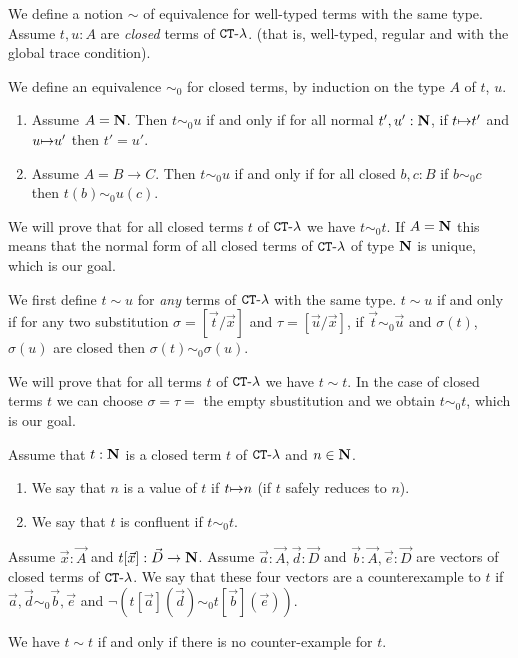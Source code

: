 \documentclass{article}
\begin{document}
We define a notion $\sim$ of equivalence for well-typed terms with the same type.
Assume $t, u : A$ are \emph{closed} terms of ${ {\tt CT} \mbox{-} \lambda}$.
 (that is, well-typed, regular and with the global trace condition). 

We define an equivalence $\sim_0$ for closed terms,
by induction on the type $A$ of $t$, $u$.

\begin{enumerate}
\item
Assume $A = {\bf N}$. Then $t \sim_0 u$ if and only if for all normal $t',u':{\bf N}$, if $t {\mapsto} t'$
and $u {\mapsto} u'$ then $t'=u'$.
\item
Assume $A = B \rightarrow C$. Then $t \sim_0 u$ if and only if for all closed $b,c:B$ if
$b \sim_0 c$ then $t(b) \sim_0 u(c)$.
\end{enumerate}

We will prove that for all closed terms $t$ of ${ {\tt CT} \mbox{-} \lambda}$ we have $t \sim_0 t$.
If $A={\bf N}$ this means that the normal form of all closed terms of ${ {\tt CT} \mbox{-} \lambda}$ of type ${\bf N}$ is unique,
which is our goal.

We first define $t \sim u$ for \emph{any} terms of ${ {\tt CT} \mbox{-} \lambda}$ with the same type.
 $t \sim u$ if and only if for any two substitution 
$\sigma = [\vec{t} / \vec{x}]$ and $\tau = [\vec{u} / \vec{x}]$,
if $\vec{t} \sim_0 \vec{u}$ and $\sigma(t)$, $\sigma(u)$ are closed then $\sigma(t) \sim_0 \sigma(u)$.

We will prove that  for all terms $t$ of ${ {\tt CT} \mbox{-} \lambda}$ we have $t \sim t$. In the case of closed terms $t$
we can choose $\sigma=\tau=$ the empty sbustitution and we obtain $t \sim_0 t$, which is our goal.

Assume that $t:{\bf N}$ is a closed term $t$ of ${ {\tt CT} \mbox{-} \lambda}$ and $n \in {\bf N}$. 
\begin{enumerate}
\item
We say that $n$ is a value of $t$ if $t {\mapsto} n$ (if $t$ safely reduces to $n$). 
\item
We say that $t$ is confluent if $t \sim_0 t$.
\end{enumerate}
Assume $\vec{x}:\vec{A}$ and $t[\vec{x}]: \vec{D} \rightarrow {\bf N}$. Assume 
$\vec{a}:\vec{A},\vec{d}:\vec{D}$ 
and $\vec{b}:\vec{A},\vec{e}:\vec{D}$ are vectors of closed terms of ${ {\tt CT} \mbox{-} \lambda}$. We say that 
these four vectors are a counterexample to $t$ if $\vec{a},\vec{d} \sim_0 \vec{b},\vec{e}$
and $\neg (t[\vec{a}](\vec{d}) \sim_0  t[\vec{b}](\vec{e}))$.

We have $t \sim t$ if and only if there is no counter-example for $t$.
\end{document}
